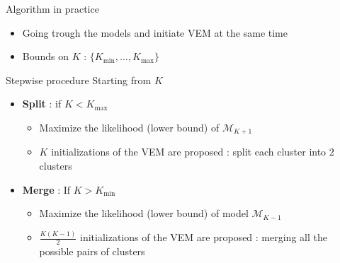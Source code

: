 \documentclass[compress,10pt]{beamer}
\begin{document}
 




\begin{frame}{Algorithm in practice}  
\begin{itemize}
\item Going trough the models and initiate VEM at the same time
\item Bounds on $K$ :  $\{K_{ \min},\dots, K_{\max}\}$
\end{itemize}

\begin{block}{Stepwise procedure}
Starting from  $K$

\begin{itemize}
\item \textbf{Split} : if $K<K_{\max}$
\begin{itemize}
\item Maximize the likelihood (lower bound) of  $\mathcal{M}_{K+1}$
\item  $K$ initializations of the VEM are proposed :  split each cluster into $2$ clusters  
\end{itemize}
\item \textbf{Merge} :  If $K>K_{\min}$
\begin{itemize}
\item Maximize the likelihood (lower bound) of   model  $\mathcal{M}_{K-1}$
\item  $\frac{K(K-1)}{2}$ initializations of the VEM are proposed :   merging all the possible pairs of  clusters 
 \end{itemize}
\end{itemize}

\end{block}
 \end{frame}
\end{document}

